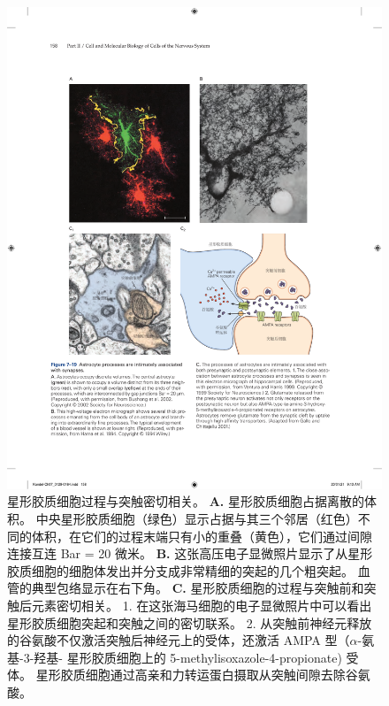 \begin{figure}[htbp]
	\centering
	\includegraphics[width=1.0\linewidth]{chap07/fig_7_19}
	\caption{星形胶质细胞过程与突触密切相关。
		\textbf{A.} 星形胶质细胞占据离散的体积。
		中央星形胶质细胞（绿色）显示占据与其三个邻居（红色）不同的体积，在它们的过程末端只有小的重叠（黄色），它们通过间隙连接互连 Bar = 20 微米\cite{bushong2002protoplasmic}。
		\textbf{B.} 这张高压电子显微照片显示了从星形胶质细胞的细胞体发出并分支成非常精细的突起的几个粗突起。
		血管的典型包络显示在右下角\cite{hama1994three}。
		\textbf{C.} 星形胶质细胞的过程与突触前和突触后元素密切相关。
		1. 在这张海马细胞的电子显微照片中可以看出星形胶质细胞突起和突触之间的密切联系\cite{ventura1999three}。
		2. 从突触前神经元释放的谷氨酸不仅激活突触后神经元上的受体，还激活 AMPA 型（$\alpha$-氨基-3-羟基- 星形胶质细胞上的 5-methylisoxazole-4-propionate) 受体。 星形胶质细胞通过高亲和力转运蛋白摄取从突触间隙去除谷氨酸\cite{gallo2001unwrapping}。}
	\label{fig:7_19}
\end{figure}


